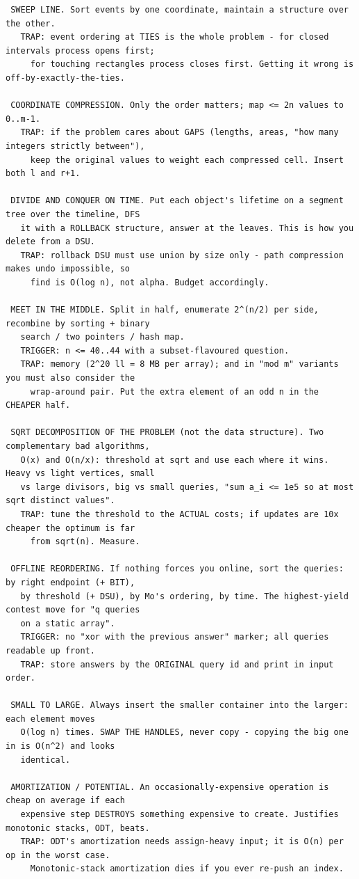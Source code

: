 \documentclass[9pt,a4paper,twocolumn]{extarticle}
\begin{document}
\begin{lstlisting}
 SWEEP LINE. Sort events by one coordinate, maintain a structure over the other.
   TRAP: event ordering at TIES is the whole problem - for closed intervals process opens first;
     for touching rectangles process closes first. Getting it wrong is off-by-exactly-the-ties.

 COORDINATE COMPRESSION. Only the order matters; map <= 2n values to 0..m-1.
   TRAP: if the problem cares about GAPS (lengths, areas, "how many integers strictly between"),
     keep the original values to weight each compressed cell. Insert both l and r+1.

 DIVIDE AND CONQUER ON TIME. Put each object's lifetime on a segment tree over the timeline, DFS
   it with a ROLLBACK structure, answer at the leaves. This is how you delete from a DSU.
   TRAP: rollback DSU must use union by size only - path compression makes undo impossible, so
     find is O(log n), not alpha. Budget accordingly.

 MEET IN THE MIDDLE. Split in half, enumerate 2^(n/2) per side, recombine by sorting + binary
   search / two pointers / hash map.
   TRIGGER: n <= 40..44 with a subset-flavoured question.
   TRAP: memory (2^20 ll = 8 MB per array); and in "mod m" variants you must also consider the
     wrap-around pair. Put the extra element of an odd n in the CHEAPER half.

 SQRT DECOMPOSITION OF THE PROBLEM (not the data structure). Two complementary bad algorithms,
   O(x) and O(n/x): threshold at sqrt and use each where it wins. Heavy vs light vertices, small
   vs large divisors, big vs small queries, "sum a_i <= 1e5 so at most sqrt distinct values".
   TRAP: tune the threshold to the ACTUAL costs; if updates are 10x cheaper the optimum is far
     from sqrt(n). Measure.

 OFFLINE REORDERING. If nothing forces you online, sort the queries: by right endpoint (+ BIT),
   by threshold (+ DSU), by Mo's ordering, by time. The highest-yield contest move for "q queries
   on a static array".
   TRIGGER: no "xor with the previous answer" marker; all queries readable up front.
   TRAP: store answers by the ORIGINAL query id and print in input order.

 SMALL TO LARGE. Always insert the smaller container into the larger: each element moves
   O(log n) times. SWAP THE HANDLES, never copy - copying the big one in is O(n^2) and looks
   identical.

 AMORTIZATION / POTENTIAL. An occasionally-expensive operation is cheap on average if each
   expensive step DESTROYS something expensive to create. Justifies monotonic stacks, ODT, beats.
   TRAP: ODT's amortization needs assign-heavy input; it is O(n) per op in the worst case.
     Monotonic-stack amortization dies if you ever re-push an index.


\end{lstlisting}
\end{document}
